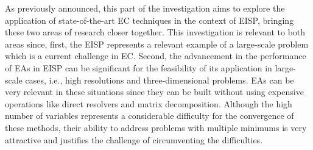 			As previously announced, this part of the investigation aims to explore the application of state-of-the-art EC techniques in the context of EISP, bringing these two areas of research closer together. This investigation is relevant to both areas since, first, the EISP represents a relevant example of a large-scale problem which is a current challenge in EC. Second, the advancement in the performance of EAs in EISP can be significant for the feasibility of its application in large-scale cases, i.e., high resolutions and three-dimensional problems. EAs can be very relevant in these situations since they can be built without using expensive operations like direct resolvers and matrix decomposition. Although the high number of variables represents a considerable difficulty for the convergence of these methods, their ability to address problems with multiple minimums is very attractive and justifies the challenge of circumventing the difficulties.
			
